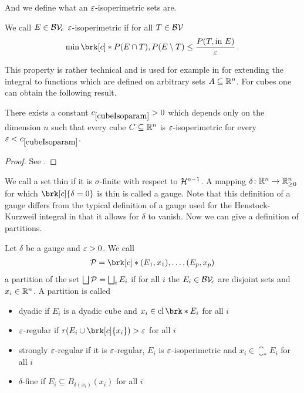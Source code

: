 \newpage
\noindent And we define what an $\e$-isoperimetric sets are.

\begin{definition}[$\e$-isoperimetric]
We call $E\in\mathcal{BV\!}_c$ $\e$-isoperimetric if for all $T\in\mathcal{BV\!}$
\begin{align*}
	\min\brk[c]*{P(E\cap T),P(E\setminus T)}\leq \frac{P(T,\text{in }E)}{\e}\,.
\end{align*}
\end{definition}

\noindent This property is rather technical and is used for example in \cite[Definition 3.11]{Pfe2016} for extending the integral to functions which are defined on arbitrary sets $A\subseteq \mathbb{R}^n$.
For cubes one can obtain the following result.

\begin{proposition}
There exists a constant $\useconstant{cubeIsoparam}>0$ which depends only on the dimension $n$ such that every cube $C\subseteq\mathbb{R}^n$ is $\e$-isoperimetric for every $\e<\useconstant{cubeIsoparam}$.
\end{proposition}
\begin{proof}
See \cite[Lemma 3.1]{Pfe2016}.
\end{proof}

We call a set thin if it is $\sigma$-finite with respect to $\mathcal{H}^{n-1}$. A mapping $\delta\colon\mathbb{R}^n\to\mathbb{R}^n_{\geq 0}$ for which $\brk[c]{\delta=0}$ is thin is called a gauge. Note that this definition of a gauge differs from the typical definition of a gauge used for the Henstock-Kurzweil integral in that it allows for $\delta$ to vanish.
Now we can give a definition of partitions.

\begin{definition}[Partitions]
Let $\delta$ be a gauge and $\varepsilon>0$.
We call
\begin{align*}
	\cP=\brk[c]*{(E_1,x_1),\dots, (E_p,x_p)}
\end{align*}
a partition of the set $\bigsqcup\mathcal{P}=\bigsqcup_iE_i$ if for all $i$ the $E_i\in\mathcal{BV\!}_c$ are disjoint sets and $x_i\in\mathbb{R}^n$. A partition is called
\begin{itemize}
	\item dyadic if $E_i$ is a dyadic cube and $x_i\in \closure\brk*{E_i}$ for all $i$
	\item $\e$-regular if $r(E_i\cup\brk[c]{x_i})>\e$ for all $i$
	\item strongly $\e$-regular if it is $\e$-regular, $E_i$ is $\e$-isoperimetric and $x_i\in\closure_*E_i$ for all $i$
	\item $\delta$-fine if $E_i\subseteq B_{\delta(x_i)}(x_i)$ for all $i$
\end{itemize}
\end{definition}


